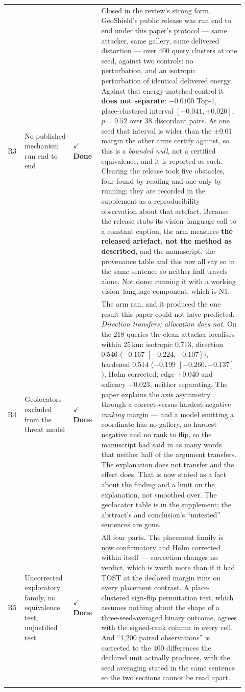 \documentclass[11pt]{article}
\newcommand{\done}{\textcolor{DoneGreen}{\textbf{$\checkmark$ Done}}}
\begin{document}
\begin{longtable}{@{}p{0.05\linewidth}p{0.19\linewidth}p{0.11\linewidth}p{0.57\linewidth}@{}}
R3 & No published mechanism run end to end & \done & Closed in the review's
strong form. GeoShield's public release was run end to end under this paper's
protocol --- same attacker, same gallery, same delivered distortion --- over
400 query clusters at one seed, against two controls: no perturbation, and an
isotropic perturbation of identical delivered energy. Against that
energy-matched control it \textbf{does not separate}: $-0.0100$ Top-1,
place-clustered interval $[-0.041,+0.020]$, $p=0.52$ over 38 discordant pairs.
At one seed that interval is wider than the $\pm0.01$ margin the other arms
certify against, so this is a \emph{bounded null}, not a certified
equivalence, and it is reported as such. Clearing the release took five
obstacles, four found by reading and one only by running; they are recorded in
the supplement as a reproducibility observation about that artefact. Because
the release stubs its vision--language call to a constant caption, the arm
measures \textbf{the released artefact, not the method as described}, and the
manuscript, the provenance table and this row all say so in the same sentence
so neither half travels alone. Not done: running it with a working
vision--language component, which is N1. \\
\addlinespace

R4 & Geolocators excluded from the threat model & \done & The arm ran, and it
produced the one result this paper could not have predicted. \emph{Direction
transfers; allocation does not.} On the 218 queries the clean attacker
localises within 25\,km: isotropic $0.713$, direction $0.546$ ($-0.167$
$[-0.224,-0.107]$), hardened $0.514$ ($-0.199$ $[-0.260,-0.137]$), Holm
corrected; edge $+0.040$ and saliency $+0.023$, neither separating. The paper
explains the axis asymmetry through a correct-versus-hardest-negative
\emph{ranking} margin --- and a model emitting a coordinate has no gallery, no
hardest negative and no rank to flip, so the manuscript had said in as many
words that neither half of the argument transfers. The explanation does not
transfer and the effect does. That is now stated as a fact about the finding
and a limit on the explanation, not smoothed over. The geolocator table is in the supplement; the
abstract's and conclusion's ``untested'' sentences are gone. \\
\addlinespace

R5 & Uncorrected exploratory family, no equivalence test, unjustified test &
\done & All four parts. The placement family is now confirmatory and Holm
corrected within itself --- correction changes no verdict, which is worth more
than if it had. TOST at the declared margin runs on every placement contrast.
A place-clustered sign-flip permutation test, which assumes nothing about the
shape of a three-seed-averaged binary outcome, agrees with the signed-rank
column in every cell. And ``1,200 paired observations'' is corrected to the
400 differences the declared unit actually produces, with the seed averaging
stated in the same sentence so the two sections cannot be read apart. \\
\addlinespace


\end{longtable}
\end{document}
